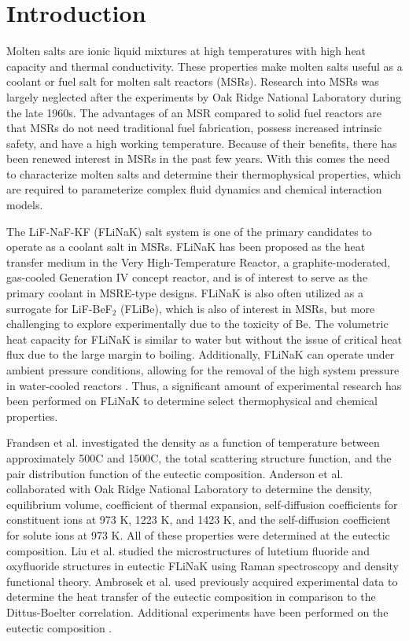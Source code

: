 \documentclass[preprint,12pt]{elsarticle}
\begin{document}
\linenumbers


\section{Introduction}
\label{sec:sample1}


Molten salts are ionic liquid mixtures at high temperatures with high heat capacity and thermal conductivity. These properties make molten salts useful as a coolant or fuel salt for molten salt reactors (MSRs). Research into MSRs was largely neglected after the experiments by Oak Ridge National Laboratory during the late 1960s\cite{Porter2022}. The advantages of an MSR compared to solid fuel reactors are that MSRs do not need traditional fuel fabrication, possess increased intrinsic safety, and have a high working temperature\cite{MSROverview}. Because of their benefits, there has been renewed interest in MSRs in the past few years. With this comes the need to characterize molten salts and determine their thermophysical properties, which are required to parameterize complex fluid dynamics and chemical interaction models\cite{Porter2022,freile2019}.


The LiF-NaF-KF (FLiNaK) salt system is one of the primary candidates to operate as a coolant salt in MSRs. FLiNaK has been proposed as the heat transfer medium in the Very High-Temperature Reactor, a graphite-moderated, gas-cooled Generation IV concept reactor\cite{Benes2009}, and is of interest to serve as the primary coolant in MSRE-type designs. FLiNaK is also often utilized as a surrogate for LiF-BeF$_2$ (FLiBe), which is also of interest in MSRs, but more challenging to explore experimentally due to the toxicity of Be. The volumetric heat capacity for FLiNaK is similar to water but without the issue of critical heat flux due to the large margin to boiling. Additionally, FLiNaK can operate under ambient pressure conditions, allowing for the removal of the high system pressure in water-cooled reactors \cite{Ambrosek2009}. Thus, a significant amount of experimental research has been performed on FLiNaK to determine select thermophysical and chemical properties.  

Frandsen et al. investigated the density as a function of temperature between approximately 500\degree C and 1500\degree C, the total scattering structure function, and the pair distribution function of the eutectic composition\cite{Frandsen2020}. Anderson et al. collaborated with Oak Ridge National Laboratory to determine the density, equilibrium volume, coefficient of thermal expansion, self-diffusion coefficients for constituent ions at 973 K, 1223 K, and 1423 K, and the self-diffusion coefficient for solute ions at 973 K\cite{Anderson2015}. All of these properties were determined at the eutectic composition. Liu et al. studied the microstructures of lutetium fluoride and oxyfluoride structures in eutectic FLiNaK using Raman spectroscopy and density functional theory\cite{Xiyan2021}. Ambrosek et al. used previously acquired experimental data to determine the heat transfer of the eutectic composition in comparison to the Dittus-Boelter correlation\cite{Ambrosek2009}. Additional experiments have been performed on the eutectic composition \cite{Hoffman1955,Holcomb2010,Yoder2014}.
\end{document}
